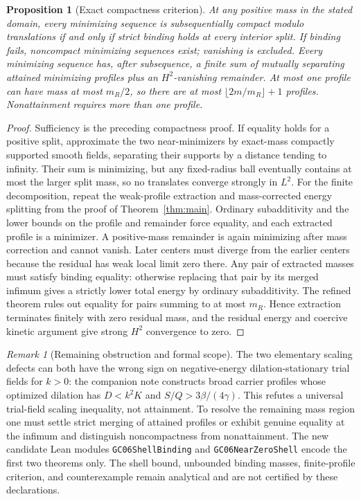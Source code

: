 \documentclass[11pt]{article}
\numberwithin{equation}{section}
\newtheorem{proposition}[theorem]{Proposition}
\theoremstyle{remark}
\newtheorem{remark}[theorem]{Remark}
\begin{document}
\begin{proposition}[Exact compactness criterion]
At any positive mass in the stated domain, every minimizing sequence
is subsequentially compact modulo translations if and only if
strict binding holds at every interior split.
If binding fails, noncompact minimizing sequences exist; vanishing
is excluded. Every minimizing sequence has, after subsequence,
a finite sum of mutually separating attained minimizing profiles
plus an $H^2$-vanishing remainder. At most one profile can have mass
at most $m_R/2$, so there are at most $\lfloor 2m/m_R\rfloor+1$
profiles. Nonattainment requires more than one profile.
\end{proposition}
\begin{proof}
Sufficiency is the preceding compactness proof.
If equality holds for a positive split, approximate the two near-minimizers
by exact-mass compactly supported smooth fields, separating their
supports by a distance tending to infinity. Their sum is minimizing,
but any fixed-radius ball eventually contains at most the larger
split mass, so no translates converge strongly in $L^2$.
For the finite decomposition, repeat the weak-profile extraction
and mass-corrected energy splitting from the proof of
Theorem~\ref{thm:main}. Ordinary subadditivity and the lower bounds
on the profile and remainder force equality, and each extracted
profile is a minimizer. A positive-mass remainder is again minimizing
after mass correction and cannot vanish. Later centers must diverge
from the earlier centers because the residual has weak local limit zero
there. Any pair of extracted masses must satisfy binding equality:
otherwise replacing that pair by its merged infimum gives a strictly
lower total energy by ordinary subadditivity. The refined theorem
rules out equality for pairs summing to at most $m_R$. Hence
extraction terminates finitely with zero residual mass, and the
residual energy and coercive kinetic argument give strong $H^2$
convergence to zero.
\end{proof}

\begin{remark}[Remaining obstruction and formal scope]
The two elementary scaling defects can both have the wrong sign on
negative-energy dilation-stationary trial fields for $k>0$:
the companion note constructs broad carrier profiles whose optimized
dilation has $D<k^2K$ and $S/Q>3\beta/(4\gamma)$.
This refutes a universal trial-field scaling inequality, not attainment.
To resolve the remaining mass region one must settle strict merging
of attained profiles or exhibit genuine equality at the infimum and
distinguish noncompactness from nonattainment. The new candidate Lean
modules \texttt{GC06ShellBinding} and \texttt{GC06NearZeroShell}
encode the first two theorems only. The shell bound, unbounded binding
masses, finite-profile criterion, and counterexample remain analytical
and are not certified by these declarations.
\end{remark}
\end{document}
